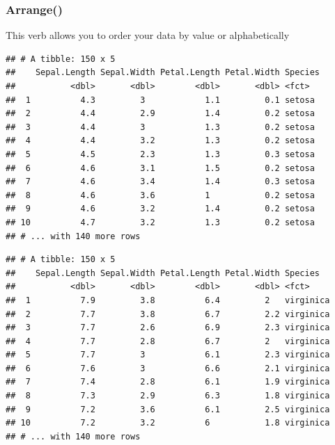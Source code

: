 \documentclass[
]{article}
\newenvironment{Shaded}{\begin{snugshade}}{\end{snugshade}}
\newcommand{\CommentTok}[1]{\textcolor[rgb]{0.56,0.35,0.01}{\textit{#1}}}
\newcommand{\KeywordTok}[1]{\textcolor[rgb]{0.13,0.29,0.53}{\textbf{#1}}}
\newcommand{\NormalTok}[1]{#1}
\newcommand{\OperatorTok}[1]{\textcolor[rgb]{0.81,0.36,0.00}{\textbf{#1}}}
\newcommand{\StringTok}[1]{\textcolor[rgb]{0.31,0.60,0.02}{#1}}
\begin{document}
\hypertarget{arrange}{%
\subsubsection{Arrange()}\label{arrange}}

This verb allows you to order your data by value or alphabetically

\begin{Shaded}
\end{Shaded}

\begin{verbatim}
## # A tibble: 150 x 5
##    Sepal.Length Sepal.Width Petal.Length Petal.Width Species
##           <dbl>       <dbl>        <dbl>       <dbl> <fct>  
##  1          4.3         3            1.1         0.1 setosa 
##  2          4.4         2.9          1.4         0.2 setosa 
##  3          4.4         3            1.3         0.2 setosa 
##  4          4.4         3.2          1.3         0.2 setosa 
##  5          4.5         2.3          1.3         0.3 setosa 
##  6          4.6         3.1          1.5         0.2 setosa 
##  7          4.6         3.4          1.4         0.3 setosa 
##  8          4.6         3.6          1           0.2 setosa 
##  9          4.6         3.2          1.4         0.2 setosa 
## 10          4.7         3.2          1.3         0.2 setosa 
## # ... with 140 more rows
\end{verbatim}

\begin{Shaded}
\end{Shaded}

\begin{verbatim}
## # A tibble: 150 x 5
##    Sepal.Length Sepal.Width Petal.Length Petal.Width Species  
##           <dbl>       <dbl>        <dbl>       <dbl> <fct>    
##  1          7.9         3.8          6.4         2   virginica
##  2          7.7         3.8          6.7         2.2 virginica
##  3          7.7         2.6          6.9         2.3 virginica
##  4          7.7         2.8          6.7         2   virginica
##  5          7.7         3            6.1         2.3 virginica
##  6          7.6         3            6.6         2.1 virginica
##  7          7.4         2.8          6.1         1.9 virginica
##  8          7.3         2.9          6.3         1.8 virginica
##  9          7.2         3.6          6.1         2.5 virginica
## 10          7.2         3.2          6           1.8 virginica
## # ... with 140 more rows
\end{verbatim}
\end{document}

